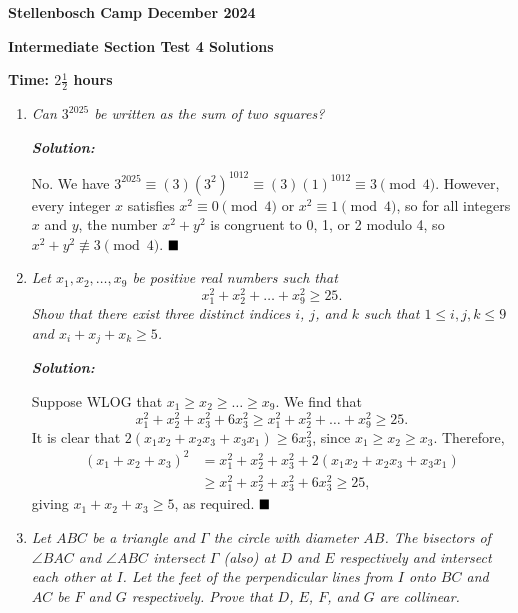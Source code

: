 \documentclass[12pt]{article}
\newcommand{\sol}{\textbf{\textit{Solution: }}}
\begin{document}
\begin{center} \large
\textbf{Stellenbosch Camp December 2024}

\textbf{Intermediate Section Test 4 Solutions}

\textbf{Time: \(2 \frac{1}{2}\) hours}
\end{center}

\begin{enumerate}[topsep=2\bigskipamount,itemsep=\bigskipamount]
\item \textit{Can $3^{2025}$ be written as the sum of two squares?}

\sol

No. We have $3^{2025} \equiv (3)(3^2)^{1012} \equiv (3)(1)^{1012} \equiv 3 \pmod 4$. However, every integer $x$ satisfies $x^2 \equiv 0 \pmod 4$ or $x^2 \equiv 1 \pmod 4$, so for all integers $x$ and $y$, the number $x^2 + y^2$ is congruent to 0, 1, or 2 modulo 4, so $x^2 + y^2 \not\equiv 3 \pmod 4$. $\hfill\blacksquare$

\item \textit{Let $x_1,x_2,\dots,x_9$ be positive real numbers such that
$$x_1^2+x_2^2+\dots + x_9^2\geqslant 25.$$
Show that there exist three distinct indices $i$, $j$, and $k$ such that $1 \leqslant i,j,k \leqslant 9$ and $x_i+x_j+x_k \geqslant 5$.}

\sol

Suppose WLOG that $x_{1} \geqslant x_{2} \geqslant \dots \geqslant x_{9}$. We find that
\[x_{1}^{2} + x_{2}^{2} + x_{3}^{2} + 6x_{3}^{2} \geqslant x_{1}^2+x_{2}^2+\dots + x_{9}^2 \geqslant 25.\]
It is clear that $2(x_{1}x_{2} + x_{2}x_{3} + x_{3}x_{1}) \geqslant 6x_{3}^2$, since $x_{1} \geqslant x_{2} \geqslant x_{3}$. Therefore,
\[\begin{aligned}
(x_{1}+x_{2}+x_{3})^{2} & = x_{1}^{2} + x_{2}^{2} + x_{3}^{2} + 2(x_{1}x_{2} + x_{2}x_{3} + x_{3}x_{1})\\
& \geqslant x_{1}^{2} + x_{2}^{2} + x_{3}^{2} + 6x_{3}^{2} \geqslant 25,
\end{aligned}\]
giving $x_{1} + x_{2} + x_{3} \geqslant 5$, as required. $\hfill\blacksquare$

\item \textit{Let $ABC$ be a triangle and $\Gamma$ the circle with diameter $AB$. The bisectors of $\angle{BAC}$ and $\angle{ABC}$ intersect $\Gamma$ (also) at $D$ and $E$ respectively and intersect each other at $I$. Let the feet of the perpendicular lines from $I$ onto $BC$ and $AC$ be $F$ and $G$ respectively. Prove that $D$, $E$, $F$, and $G$ are collinear.}


\end{enumerate}
\end{document}
